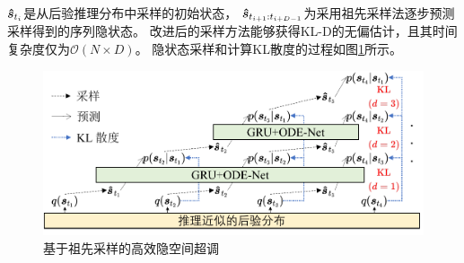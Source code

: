 $\boldsymbol{\hat{s}}_{t_{i}}$是从后验推理分布中采样的初始状态，
$\boldsymbol{\hat{s}}_{t_{i+1}:t_{i+D-1}}$为采用祖先采样法逐步预测采样得到的序列隐状态。
改进后的采样方法能够获得KL-D的无偏估计，且其时间复杂度仅为$\mathcal{O}(N\times D)$。
隐状态采样和计算KL散度的过程如图\ref{fig:overshooting}所示。
\begin{figure}[ht]
    \centering
    \includegraphics[width=0.9\linewidth]{figures/chapter5/overshooting.pdf}
    \caption{基于祖先采样的高效隐空间超调}
    \label{fig:overshooting}
\end{figure}


